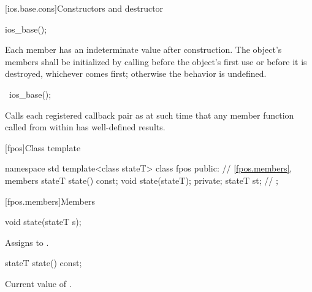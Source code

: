 [ios.base.cons]{Constructors and destructor}

%
\begin{itemdecl}
ios_base();
\end{itemdecl}

\begin{itemdescr}
\pnum
\effects
Each
member has an indeterminate value after construction.
The object's members shall be initialized by calling
before the object's first use or before it is destroyed, whichever comes first; otherwise
the behavior is undefined.
\end{itemdescr}

%
\begin{itemdecl}
~ios_base();
\end{itemdecl}

\begin{itemdescr}
\pnum
\effects
Calls each registered callback pair
 as
at such time that any
member function called from within
has well-defined results.
\end{itemdescr}

[fpos]{Class template }

%
\begin{codeblock}
namespace std {
  template<class stateT> class fpos {
  public:
    // \ref{fpos.members}, members
    stateT state() const;
    void state(stateT);
  private;
    stateT st;                  // \expos
  };
}
\end{codeblock}

[fpos.members]{Members}

%
\begin{itemdecl}
void state(stateT s);
\end{itemdecl}

\begin{itemdescr}
\pnum
\effects
Assigns  to .
\end{itemdescr}

%
\begin{itemdecl}
stateT state() const;
\end{itemdecl}

\begin{itemdescr}
\pnum
\returns
Current value of .
\end{itemdescr}

